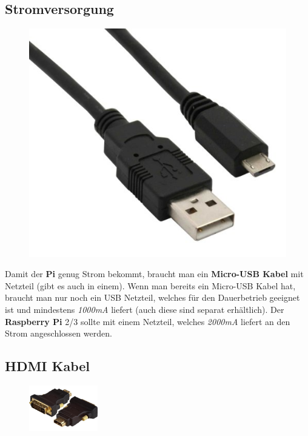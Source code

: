 \documentclass[12pt,a4paper]{article}
\newcommand{\rp}{\textbf{Raspberry Pi}\xspace}
\begin{document}
\subsection{Stromversorgung}

\begin{figure}
  \vspace{-12pt}
  \begin{center}
    \includegraphics[scale=0.2]{microusb}
  \end{center}
  \vspace{-25pt}
\end{figure}

Damit der \textbf{Pi} genug Strom bekommt, braucht man ein \textbf{Micro-USB Kabel} mit Netzteil (gibt es auch in einem). Wenn man bereits ein Micro-USB Kabel hat, braucht man nur noch ein USB Netzteil, welches für den Dauerbetrieb geeignet ist und mindestens \textit{1000mA} liefert (auch diese sind separat erhältlich). Der \rp 2/3 sollte mit einem Netzteil, welches \textit{2000mA} liefert an den Strom angeschlossen werden.

\subsection{HDMI Kabel}

\begin{figure}
  \vspace{-30pt}
  \begin{center}
    \includegraphics[width=3cm]{hdmi}
  \end{center}
  \vspace{-25pt}
\end{figure}
\end{document}
